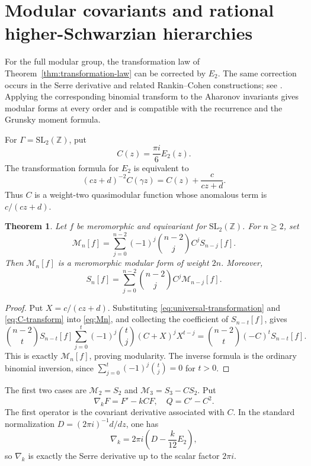 \documentclass[11pt]{amsart}
\newtheorem{thm}{Theorem}[section]
\theoremstyle{definition}
\theoremstyle{remark}
\numberwithin{equation}{section}
\begin{document}
\section{Modular covariants and rational higher-Schwarzian hierarchies}

For the full modular group, the transformation law of Theorem~\ref{thm:transformation-law} can be corrected by $E_2$. The same correction occurs in the Serre derivative and related Rankin--Cohen constructions; see \cite{ka-za,123}. Applying the corresponding binomial transform to the Aharonov invariants gives modular forms at every order and is compatible with the recurrence and the Grunsky moment formula.

For $\Gamma=\mathrm{SL}_2(\mathbb Z)$, put
\begin{equation*}
C(z)=\frac{\pi i}{6}E_2(z).
\end{equation*}
The transformation formula for $E_2$ is equivalent to
\begin{equation}\label{eq:C-transform}
(cz+d)^{-2}C(\gamma z)
=
C(z)+\frac{c}{cz+d}.
\end{equation}
Thus $C$ is a weight-two quasimodular function whose anomalous term is 
\(c/(cz+d)\).
\begin{thm}\label{thm:modular-covariants}
Let $f$ be meromorphic and equivariant for $\mathrm{SL}_2(\mathbb Z)$. For $n\geq2$, set
\begin{equation}\label{eq:Mn}
\mathcal M_n[f]
=
\sum_{j=0}^{n-2}
(-1)^j\binom{n-2}{j}C^jS_{n-j}[f].
\end{equation}
Then $\mathcal M_n[f]$ is a meromorphic modular form of weight $2n$. Moreover,
\begin{equation}\label{eq:inverse-Mn}
S_n[f]
=
\sum_{j=0}^{n-2}
\binom{n-2}{j}C^j\mathcal M_{n-j}[f].
\end{equation}
\end{thm}

\begin{proof}
Put \(X=c/(cz+d)\). Substituting \eqref{eq:universal-transformation} and \eqref{eq:C-transform} into \eqref{eq:Mn}, and collecting the coefficient of \(S_{n-t}[f]\), gives
\[
\binom{n-2}{t}S_{n-t}[f]
\sum_{j=0}^t(-1)^j\binom tj(C+X)^jX^{t-j}
=
\binom{n-2}{t}(-C)^tS_{n-t}[f].
\]
This is exactly \(\mathcal M_n[f]\), proving modularity. The inverse formula is the ordinary binomial inversion, since
\(
\sum_{j=0}^t(-1)^j\binom tj=0
\)
for \(t>0\).
\end{proof}

The first two cases are $\mathcal M_2=S_2$ and $\mathcal M_3=S_3-CS_2$. Put
\begin{equation*}
\nabla_kF=F'-kCF,
\quad
Q=C'-C^2.
\end{equation*}
The first operator is the covariant derivative associated with $C$. In the standard normalization $D=(2\pi i)^{-1}d/dz$, one has
\[
\nabla_k=2\pi i\left(D-\frac{k}{12}E_2\right),
\]
so $\nabla_k$ is exactly the Serre derivative up to the scalar factor $2\pi i$.
\end{document}
